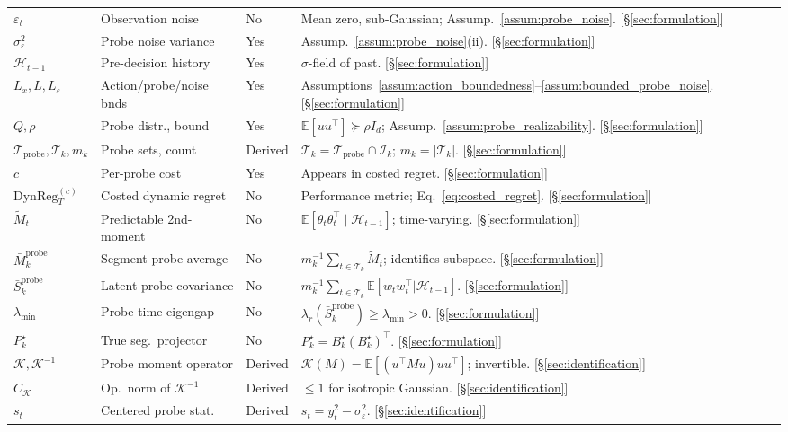 \documentclass{article}
\newcommand{\E}{\mathbb{E}}
\newcommand{\cH}{\mathcal{H}}
\newcommand{\cT}{\mathcal{T}}
\newcommand{\cI}{\mathcal{I}}
\newcommand{\cTprobe}{\mathcal{T}_{\mathrm{probe}}}
\newcommand{\DynReg}{\mathrm{DynReg}}
\begin{document}
\begin{longtable}{@{}p{} p{} p{} p{}@{}}
$\varepsilon_t$ & Observation noise & No & Mean zero, sub-Gaussian; Assump.~\ref{assum:probe_noise}. [\S\ref{sec:formulation}] \\
$\sigma_\varepsilon^2$ & Probe noise variance & Yes & Assump.~\ref{assum:probe_noise}(ii). [\S\ref{sec:formulation}] \\
$\cH_{t-1}$ & Pre-decision history & Yes & $\sigma$-field of past. [\S\ref{sec:formulation}] \\
$L_x, L, L_\varepsilon$ & Action/probe/noise bnds & Yes & Assumptions~\ref{assum:action_boundedness}--\ref{assum:bounded_probe_noise}. [\S\ref{sec:formulation}] \\
$Q, \rho$ & Probe distr., bound & Yes & $\E[uu^\top] \succeq \rho I_d$; Assump.~\ref{assum:probe_realizability}. [\S\ref{sec:formulation}] \\
$\cTprobe, \cT_k, m_k$ & Probe sets, count & Derived & $\cT_k = \cTprobe \cap \cI_k$; $m_k = |\cT_k|$. [\S\ref{sec:formulation}] \\
$c$ & Per-probe cost & Yes & Appears in costed regret. [\S\ref{sec:formulation}] \\
$\DynReg_T^{(c)}$ & Costed dynamic regret & No & Performance metric; Eq.~\eqref{eq:costed_regret}. [\S\ref{sec:formulation}] \\
$\widetilde M_t$ & Predictable 2nd-moment & No & $\E[\theta_t\theta_t^\top\mid\cH_{t-1}]$; time-varying. [\S\ref{sec:formulation}] \\
$\bar M_k^{\mathrm{probe}}$ & Segment probe average & No & $m_k^{-1}\sum_{t\in\cT_k}\widetilde M_t$; identifies subspace. [\S\ref{sec:formulation}] \\
$\bar S_k^{\mathrm{probe}}$ & Latent probe covariance & No & $m_k^{-1}\sum_{t\in\cT_k}\E[w_tw_t^\top|\cH_{t-1}]$. [\S\ref{sec:formulation}] \\
$\lambda_{\min}$ & Probe-time eigengap & No & $\lambda_r(\bar S_k^{\mathrm{probe}}) \ge \lambda_{\min} > 0$. [\S\ref{sec:formulation}] \\
$P_k^\star$ & True seg.\ projector & No & $P_k^\star=B_k^\star(B_k^\star)^\top$. [\S\ref{sec:formulation}] \\
$\mathcal K, \mathcal K^{-1}$ & Probe moment operator & Derived & $\mathcal K(M)=\E[(u^\top Mu)uu^\top]$; invertible. [\S\ref{sec:identification}] \\
$C_{\mathcal K}$ & Op.\ norm of $\mathcal K^{-1}$ & Derived & $\le 1$ for isotropic Gaussian. [\S\ref{sec:identification}] \\
$s_t$ & Centered probe stat. & Derived & $s_t=y_t^2-\sigma_\varepsilon^2$. [\S\ref{sec:identification}] \\

\end{longtable}
\end{document}
